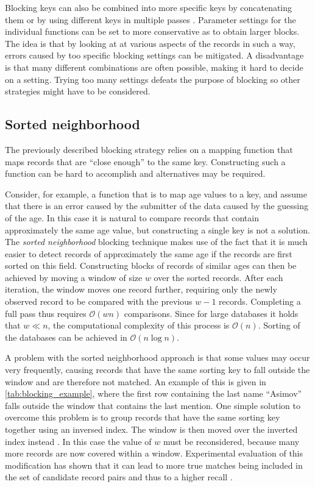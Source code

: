 Blocking keys can also be combined into more specific keys by concatenating them \citep{Christen2012} or by using different keys in multiple passes \citep{Baxter2003}.
Parameter settings for the individual functions can be set to more conservative as to obtain larger blocks.
The idea is that by looking at at various aspects of the records in such a way, errors caused by too specific blocking settings can be mitigated.
A disadvantage is that many different combinations are often possible, making it hard to decide on a setting.
Trying too many settings defeats the purpose of blocking so other strategies might have to be considered.




\subsection{Sorted neighborhood}
\label{sec:sorted_neighborhood}

The previously described blocking strategy relies on a mapping function that maps records that are ``close enough'' to the same key.
Constructing such a function can be hard to accomplish and alternatives may be required.

Consider, for example, a function that is to map age values to a key, and assume that there is an error caused by the submitter of the data caused by the guessing of the age.
In this case it is natural to compare records that contain approximately the same age value, but constructing a single key is not a solution.
The \emph{sorted neighborhood} blocking technique \citep{Hernandez1995} makes use of the fact that it is much easier to detect records of approximately the same age if the records are first sorted on this field.
Constructing blocks of records of similar ages can then be achieved by moving a window of size $w$ over the sorted records.
After each iteration, the window moves one record further, requiring only the newly observed record to be compared with the previous $w-1$ records.
Completing a full pass thus requires $\mathcal{O}(wn)$ comparisons.
Since for large databases it holds that $w \ll n$, the computational complexity of this process is $\mathcal{O}(n)$.
Sorting of the databases can be achieved in $\mathcal{O}(n \log n)$.

A problem with the sorted neighborhood approach is that some values may occur very frequently, causing records that have the same sorting key to fall outside the window and are therefore not matched.
An example of this is given in \cref{tab:blocking_example}, where the first row containing the last name ``Asimov'' falls outside the window that contains the last mention.
One simple solution to overcome this problem is to group records that have the same sorting key together using an inversed index.
The window is then moved over the inverted index instead \citep{Christen2012}.
In this case the value of $w$ must be reconsidered, because many more records are now covered within a window.
Experimental evaluation of this modification has shown that it can lead to more true matches being included in the set of candidate record pairs and thus to a higher recall \citep{Christen2012}.


